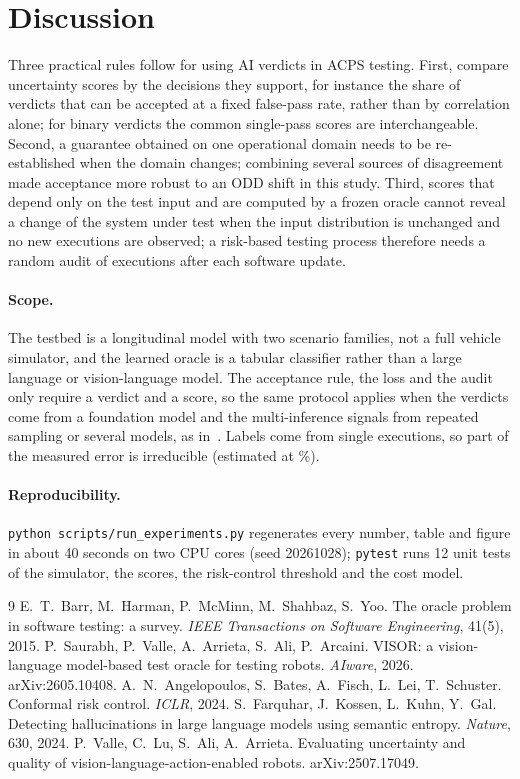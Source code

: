 \documentclass[10pt,a4paper]{article}
\begin{document}
\section{Discussion}
Three practical rules follow for using AI verdicts in ACPS testing. First, compare uncertainty scores by the decisions they support, for instance the share of verdicts that can be accepted at a fixed false-pass rate, rather than by correlation alone; for binary verdicts the common single-pass scores are interchangeable. Second, a guarantee obtained on one operational domain needs to be re-established when the domain changes; combining several sources of disagreement made acceptance more robust to an ODD shift in this study. Third, scores that depend only on the test input and are computed by a frozen oracle cannot reveal a change of the system under test when the input distribution is unchanged and no new executions are observed; a risk-based testing process therefore needs a random audit of executions after each software update.

\paragraph{Scope.} The testbed is a longitudinal model with two scenario families, not a full vehicle simulator, and the learned oracle is a tabular classifier rather than a large language or vision-language model. The acceptance rule, the loss and the audit only require a verdict and a score, so the same protocol applies when the verdicts come from a foundation model and the multi-inference signals from repeated sampling or several models, as in~\cite{visor2026,farquhar2024}. Labels come from single executions, so part of the measured error is irreducible (estimated at \numBayesErr\%).

\paragraph{Reproducibility.} \texttt{python scripts/run\_experiments.py} regenerates every number, table and figure in about 40 seconds on two CPU cores (seed 20261028); \texttt{pytest} runs 12 unit tests of the simulator, the scores, the risk-control threshold and the cost model.

\begin{thebibliography}{9}\small
{} E.~T.~Barr, M.~Harman, P.~McMinn, M.~Shahbaz, S.~Yoo. The oracle problem in software testing: a survey. \emph{IEEE Transactions on Software Engineering}, 41(5), 2015.
 P.~Saurabh, P.~Valle, A.~Arrieta, S.~Ali, P.~Arcaini. VISOR: a vision-language model-based test oracle for testing robots. \emph{AIware}, 2026. arXiv:2605.10408.
 A.~N.~Angelopoulos, S.~Bates, A.~Fisch, L.~Lei, T.~Schuster. Conformal risk control. \emph{ICLR}, 2024.
 S.~Farquhar, J.~Kossen, L.~Kuhn, Y.~Gal. Detecting hallucinations in large language models using semantic entropy. \emph{Nature}, 630, 2024.
 P.~Valle, C.~Lu, S.~Ali, A.~Arrieta. Evaluating uncertainty and quality of vision-language-action-enabled robots. arXiv:2507.17049.
\end{thebibliography}
\end{document}
